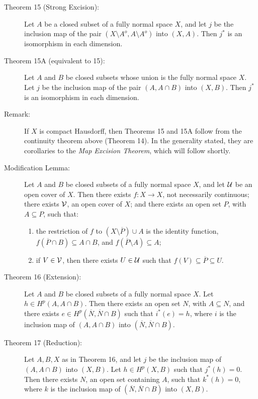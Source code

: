 \documentclass{article}
\begin{document}
\begin{description}

\item[Theorem 15 (Strong Excision):] Let $A$ be a closed subset of a fully normal space $X$, and let $j$ be the inclusion map of the pair $(X \setminus A^o, A \setminus A^o)$ into $(X,A)$. Then $j^*$ is an isomorphism in each dimension.

\item[Theorem 15A (equivalent to 15):] Let $A$ and $B$ be closed subsets whose union is the fully normal space $X$. Let $j$ be the inclusion map of the pair $(A, A \cap B)$ into $(X,B)$. Then $j^*$ is an isomorphism in each dimension.

\item[Remark:] If $X$ is compact Hausdorff, then Theorems 15 and 15A follow from the continuity theorem above (Theorem 14). In the generality stated, they are corollaries to the \emph{Map Excision Theorem}, which will follow shortly.

\item[Modification Lemma:] Let $A$ and $B$ be closed subsets of a fully normal space $X$, and let ${\cal U}$ be an open cover of $X$. Then there exists $f: X \longrightarrow X$, not necessarily continuous; there exists ${\cal V}$, an open cover of $X$; and there exists an open set $P$, with $A \subseteq P$, such that:
  \begin{enumerate}[\hspace{1cm}(1)]
    \item the restriction of $f$ to $(X \setminus \overline{P}) \cup A$ is the identity function, $f(\overline{P} \cap B) \subseteq A \cap B$, and $f(\overline{P} \setminus A) \subseteq A$;
    \item if $V \in {\cal V}$, then there exists $U \in {\cal U}$ such that $f(V) \subseteq \overline{P} \subseteq U$.
  \end{enumerate}

\item[Theorem 16 (Extension):] Let $A$ and $B$ be closed subsets of a fully normal space $X$. Let $h \in H^p(A,A \cap B)$. Then there exists an open set $N$, with $A \subseteq N$, and there exists $e \in H^p(\overline{N}, \overline{N} \cap B)$ such that $i^*(e)=h$, where $i$ is the inclusion map of $(A, A \cap B)$ into $(\overline{N}, \overline{N} \cap B)$.

\item[Theorem 17 (Reduction):] Let $A,B,X$ as in Theorem 16, and let $j$ be the inclusion map of $(A, A \cap B)$ into $(X,B)$. Let $h \in H^p(X,B)$ such that $j^*(h)=0$. Then there exists $N$, an open set containing $A$, such that $k^*(h)=0$, where $k$ is the inclusion map of $(\overline{N}, \overline{N} \cap B)$ into $(X,B)$.


\end{description}
\end{document}
